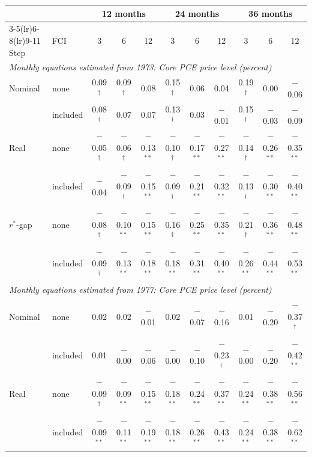 \begin{tabular}{llccccccccc}
\toprule
 & & \multicolumn{3}{c}{12 months} & \multicolumn{3}{c}{24 months} & \multicolumn{3}{c}{36 months}\\
\cmidrule(lr){3-5}\cmidrule(lr){6-8}\cmidrule(lr){9-11}
Step & FCI & 3 & 6 & 12 & 3 & 6 & 12 & 3 & 6 & 12 \\
\midrule
\multicolumn{11}{l}{\textit{Monthly equations estimated from 1973: Core PCE price level (percent)}}\\
Nominal & none & 0.09$^{\dagger}$ & 0.09$^{\dagger}$ & 0.08 & 0.15$^{\dagger}$ & 0.06 & 0.04 & 0.19$^{\dagger}$ & 0.00 & $-$0.06 \\
 & included & 0.08$^{\dagger}$ & 0.07 & 0.07 & 0.13$^{\dagger}$ & 0.03 & $-$0.01 & 0.15$^{\dagger}$ & $-$0.03 & $-$0.09 \\
Real & none & $-$0.05$^{\dagger}$ & $-$0.06$^{\dagger}$ & $-$0.13$^{**}$ & $-$0.10$^{\dagger}$ & $-$0.17$^{**}$ & $-$0.27$^{**}$ & $-$0.14$^{\dagger}$ & $-$0.26$^{**}$ & $-$0.35$^{**}$ \\
 & included & $-$0.04 & $-$0.09$^{\dagger}$ & $-$0.15$^{**}$ & $-$0.09$^{\dagger}$ & $-$0.21$^{**}$ & $-$0.32$^{**}$ & $-$0.13$^{\dagger}$ & $-$0.30$^{**}$ & $-$0.40$^{**}$ \\
$r^*$-gap & none & $-$0.08$^{\dagger}$ & $-$0.10$^{**}$ & $-$0.15$^{**}$ & $-$0.16$^{\dagger}$ & $-$0.25$^{**}$ & $-$0.35$^{**}$ & $-$0.21$^{\dagger}$ & $-$0.36$^{**}$ & $-$0.48$^{**}$ \\
 & included & $-$0.09$^{\dagger}$ & $-$0.13$^{**}$ & $-$0.18$^{**}$ & $-$0.18$^{**}$ & $-$0.31$^{**}$ & $-$0.40$^{**}$ & $-$0.26$^{**}$ & $-$0.44$^{**}$ & $-$0.53$^{**}$ \\
\midrule
\multicolumn{11}{l}{\textit{Monthly equations estimated from 1977: Core PCE price level (percent)}}\\
Nominal & none & 0.02 & 0.02 & $-$0.01 & 0.02 & $-$0.07 & $-$0.16 & 0.01 & $-$0.20 & $-$0.37$^{\dagger}$ \\
 & included & 0.01 & $-$0.00 & $-$0.06 & $-$0.00 & $-$0.10 & $-$0.23$^{\dagger}$ & $-$0.00 & $-$0.20 & $-$0.42$^{**}$ \\
Real & none & $-$0.09$^{\dagger}$ & $-$0.09$^{**}$ & $-$0.15$^{**}$ & $-$0.18$^{**}$ & $-$0.24$^{**}$ & $-$0.37$^{**}$ & $-$0.24$^{**}$ & $-$0.38$^{**}$ & $-$0.56$^{**}$ \\
 & included & $-$0.09$^{**}$ & $-$0.11$^{**}$ & $-$0.19$^{**}$ & $-$0.18$^{**}$ & $-$0.26$^{**}$ & $-$0.43$^{**}$ & $-$0.24$^{**}$ & $-$0.38$^{**}$ & $-$0.62$^{**}$ \\

\end{tabular}
